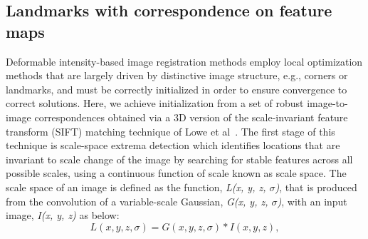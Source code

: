 \documentclass{llncs}
\begin{document}
\subsection{Landmarks with correspondence on feature maps}
\label{subsec:Correspondence}
Deformable intensity-based image registration methods employ local optimization methods that are largely driven by distinctive image structure, e.g., corners or landmarks, and must be correctly initialized in order to ensure convergence to correct solutions. Here, we achieve initialization from a set of robust image-to-image correspondences obtained via a 3D version of the scale-invariant feature transform (SIFT) matching technique of Lowe et al~\cite{Lowe:04}. The first stage of this technique is scale-space extrema detection which identifies locations that are invariant to scale change of the image by searching for stable features across all possible scales, using a continuous function of scale known as scale space. The scale space of an image is defined as the function, \textit{L(x, y, z, $\sigma$)}, that is produced from the convolution of a variable-scale Gaussian, \textit{G(x, y, z, $\sigma$)}, with an input image, \textit{I(x, y, z)} as below:
\begin{equation}
    L(x, y, z, \sigma) = G(x, y, z, \sigma) * I(x, y, z),
\end{equation}
\end{document}
